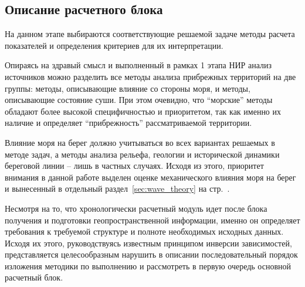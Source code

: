 
\subsection{Описание расчетного блока}

На данном этапе выбираются соответствующие решаемой задаче методы расчета показателей и определения критериев для их интерпретации.

Опираясь на здравый смысл и выполненный в 
рамках 1 этапа НИР анализ источников можно разделить все методы анализа прибрежных территорий на две группы: методы, описывающие влияние со стороны моря, и методы, описывающие состояние суши.
При этом очевидно, что \enquote{морские} методы обладают более высокой специфичностью и приоритетом, так как именно их наличие и определяет \enquote{прибрежность} рассматриваемой территории.

Влияние моря на берег должно учитываться во всех вариантах решаемых в методе задач, а методы анализа рельефа, геологии и исторической динамики береговой линии -- лишь в частных случаях.
Исходя из этого, приоритет внимания в данной работе выделен оценке механического влияния моря на берег и вынесенный в отдельный раздел~\ref{sec:wave_theory} на стр.~\pageref{sec:wave_theory}.

Несмотря на то, что хронологически расчетный модуль идет после блока получения и подготовки геопространственной информации, именно он определяет требования к требуемой структуре и полноте необходимых исходных данных.
Исходя их этого, руководствуясь известным принципом инверсии зависимостей, представляется целесообразным нарушить в описании последовательный порядок изложения методики по выполнению и рассмотреть в первую очередь основной расчетный блок.

